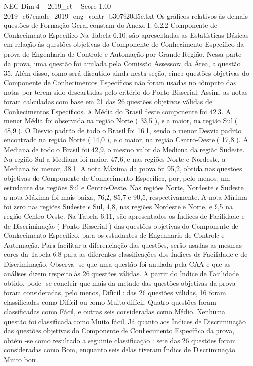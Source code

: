 \begin{textsample}{NEG Dim 4 – 2019\_c6 – Score 1.00 – 2019\_c6/enade\_2019\_eng\_contr\_b307920d5e.txt}
Os gráficos relativos às demais questões de Formação Geral constam do Anexo I. 6.2.2 Componente de Conhecimento Específico Na Tabela 6.10, são apresentadas as Estatísticas Básicas em relação às questões objetivas do Componente de Conhecimento Específico da prova de Engenharia de Controle e Automação por Grande Região.
Nessa parte da prova, uma questão foi anulada pela Comissão Assessora da Área, a questão 35.
Além disso, como será discutido ainda nesta seção, cinco questões objetivas do Componente de Conhecimentos Específicos não foram usadas no cômputo das notas por terem sido descartadas pelo critério do Ponto-Bisserial.
Assim, as notas foram calculadas com base em 21 das 26 questões objetivas válidas de Conhecimentos Específicos.
A Média do Brasil deste componente foi 42,3.
A menor Média foi observada na região Norte ( 33,5 ), e a maior, na região Sul ( 48,9 ).
O Desvio padrão de todo o Brasil foi 16,1, sendo o menor Desvio padrão encontrado na região Norte ( 14,0 ), e o maior, na região Centro-Oeste ( 17,8 ).
A Mediana de todo o Brasil foi 42,9, o mesmo valor da Mediana da região Sudeste.
Na região Sul a Mediana foi maior, 47,6, e nas regiões Norte e Nordeste, a Mediana foi menor, 38,1.
A nota Máxima da prova foi 95,2, obtida nas questões objetivas do Componente de Conhecimento Específico, por, pelo menos, um estudante das regiões Sul e Centro-Oeste.
Nas regiões Norte, Nordeste e Sudeste a nota Máxima foi mais baixa, 76,2, 85,7 e 90,5, respectivamente.
A nota Mínima foi zero nas regiões Sudeste e Sul, 4,8, nas regiões Nordeste e Norte, e 9,5 na região Centro-Oeste.
Na Tabela 6.11, são apresentados os Índices de Facilidade e de Discriminação ( Ponto-Bisserial ) das questões objetivas do Componente de Conhecimento Específico, para os estudantes de Engenharia de Controle e Automação.
Para facilitar a diferenciação das questões, serão usadas as mesmas cores da Tabela 6.8 para as diferentes classificações dos Índices de Facilidade e de Discriminação.
Observa -se que uma questão foi anulada pela CAA e que as análises dizem respeito às 26 questões válidas.
A partir do Índice de Facilidade obtido, pode -se concluir que mais da metade das questões objetivas da prova foram consideradas, pelo menos, Difícil : das 26 questões válidas, 16 foram classificadas como Difícil ou como Muito difícil.
Quatro questões foram classificadas como Fácil, e outras seis consideradas como Médio.
Nenhuma questão foi classificada como Muito fácil.
Já quanto aos Índices de Discriminação das questões objetivas do Componente de Conhecimento Específico da prova, obtém -se como resultado a seguinte classificação : sete das 26 questões foram consideradas como Bom, enquanto seis delas tiveram Índice de Discriminação Muito bom.

\end{textsample}
